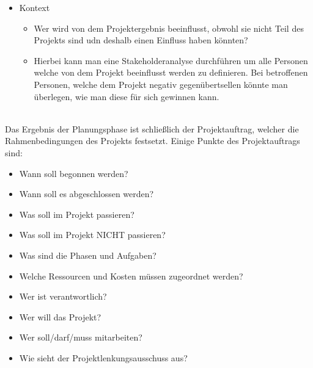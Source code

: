 \documentclass{article}
\begin{document}
\begin{itemize}
\begin{itemize}
			\item{Kontext}
			\begin{itemize}
				\item{Wer wird von dem Projektergebnis beeinflusst, obwohl sie nicht Teil des Projekts sind udn deshalb einen Einfluss haben könnten?}
				\item{Hierbei kann man eine Stakeholderanalyse durchführen um alle Personen welche von dem Projekt beeinflusst werden zu definieren. Bei betroffenen Personen, welche dem Projekt negativ gegenübertsellen könnte man überlegen, wie man diese für sich gewinnen kann.}
			\end{itemize}
		\end{itemize}
	\end{itemize} \\
	Das Ergebnis der Planungsphase ist schließlich der Projektauftrag, welcher die Rahmenbedingungen des Projekts festsetzt. Einige Punkte des Projektauftrags sind:
	\begin{itemize}
		\item{Wann soll begonnen werden?}
		\item{Wann soll es abgeschlossen werden?}
		\item{Was soll im Projekt passieren?}
		\item{Was soll im Projekt NICHT passieren?}
		\item{Was sind die Phasen und Aufgaben?}
		\item{Welche Ressourcen und Kosten müssen zugeordnet werden?}
		\item{Wer ist verantwortlich?}
		\item{Wer will das Projekt?}
		\item{Wer soll/darf/muss mitarbeiten?}
		\item{Wie sieht der Projektlenkungsausschuss aus?}
	\end{itemize}
\end{document}
